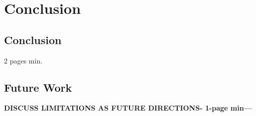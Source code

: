\chapter{Conclusion} %
\label{cha:_Conclusion}

\section{Conclusion} %
\label{sec:section_11}
 2 pages min.


\section{Future Work}
\textbf{DISCUSS LIMITATIONS AS FUTURE DIRECTIONS- 1-page min---}